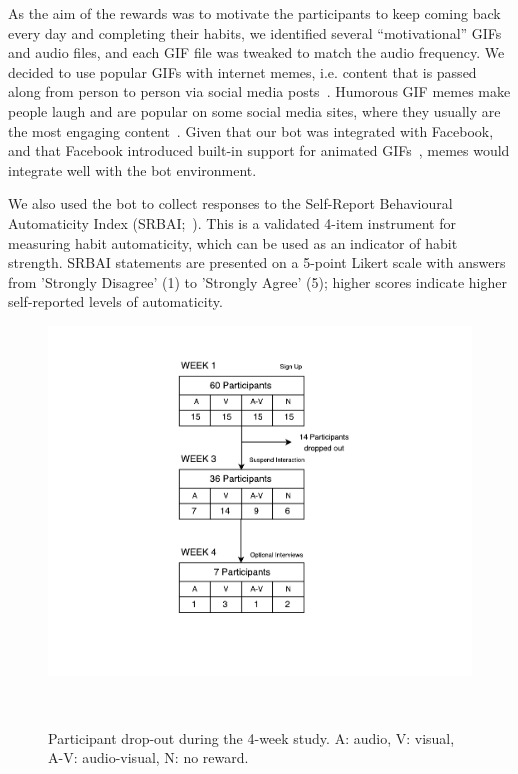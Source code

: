 \documentclass{scaffold/sigchi}
\begin{document}
As the aim of the rewards was to motivate the participants to keep coming back every day and completing their habits, we identified several ``motivational'' GIFs and audio files, and each GIF file was tweaked to match the audio frequency. We decided to use popular GIFs with internet memes, i.e. content that is passed along from person to person via social media posts~\cite{meme_definition}. Humorous GIF memes make people laugh and are popular on some social media sites, where they usually are the most engaging content~\cite{meme_gifs_are_good}. Given that our bot was integrated with Facebook, and that Facebook introduced built-in support for animated GIFs~\cite{fb_gif_rollout}, memes would integrate well with the bot environment. 

We also used the bot to collect responses to the Self-Report Behavioural Automaticity Index (SRBAI;~\cite{article_4q_SRBAI}). This is a validated 4-item instrument for measuring habit automaticity, which can be used as an indicator of habit strength. SRBAI statements are presented on a 5-point Likert scale with answers from 'Strongly Disagree' (1) to 'Strongly Agree' (5); higher scores indicate higher self-reported levels of automaticity.

\begin{figure}
  \centering
  \includegraphics[width=.95\columnwidth]{figures/study-flow.pdf}
  \caption{Participant drop-out during the 4-week study. A: audio, V: visual, A-V: audio-visual, N: no reward.}~\label{fig:study_dropout}
\end{figure}
\end{document}
